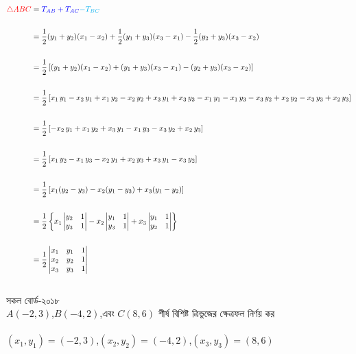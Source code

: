 \documentclass{article}
\begin{document}
\begin{align*}
\textcolor{red}{\triangle ABC}&=\textcolor{blue}{T_{AB}+T_{AC}}\textcolor{cyan}{-T_{BC}}\\
\\
&=\frac{1}{2}(y_1+y_2)(x_1-x_2)+\frac{1}{2}(y_1+y_3)(x_3-x_1)-\frac{1}{2}(y_2+y_3)(x_3-x_2)\\
\\
&=\frac{1}{2}\left[(y_1+y_2)(x_1-x_2)+(y_1+y_3)(x_3-x_1)-(y_2+y_3)(x_3-x_2)\right]\\
\\
&=\frac{1}{2}\left[x_1\,y_1-x_2\,y_1+x_1\,y_2-x_2\,y_2+x_3\,y_1+x_3\,y_3-x_1\,y_1-x_1\,y_3-x_3\,y_2+x_2\,y_2-x_3\,y_3+x_2\,y_3\right]\\
\\
&=\frac{1}{2}\left[-x_2\,y_1+x_1\,y_2+x_3\,y_1-x_1\,y_3-x_3\,y_2+x_2\,y_3\right]\\
\\
&=\frac{1}{2}\left[x_1\,y_2-x_1\,y_3-x_2\,y_1+x_2\,y_3+x_3\,y_1-x_3\,y_2\right]\\
\\
&=\frac{1}{2}\left[x_1(y_2-y_3)-x_2(y_1-y_3)+x_3(y_1-y_2)\right]\\
\\
&=\frac{1}{2}\left\{x_1\begin{vmatrix}
	y_2 & 1\\
	y_3 & 1
\end{vmatrix}-x_2\begin{vmatrix}
	y_1 & 1\\
	y_3 & 1
\end{vmatrix}+x_3\begin{vmatrix}
	y_1 & 1\\
	y_2 & 1
\end{vmatrix}\right\}\\
\\
&=\frac{1}{2}\begin{vmatrix}
x_1 &	y_1 & 1\\
x_2 & y_2 & 1\\
x_3 & y_3 & 1
\end{vmatrix}
\end{align*}
\\
সকল বোর্ড-২০১৮\\ 
$A(-2,3)$,\quad  $B(-4,2)$,\quad এবং $C(8,6)$ শীর্ষ  বিশিষ্ট ত্রিভুজের ক্ষেত্রফল নির্ণয় কর \\ 
\\
$(x_1,y_1)=(-2,3)$,\quad $(x_2,y_2)=(-4,2)$,\quad $(x_3,y_3)=(8,6)$\\
\\ 
\end{document}
